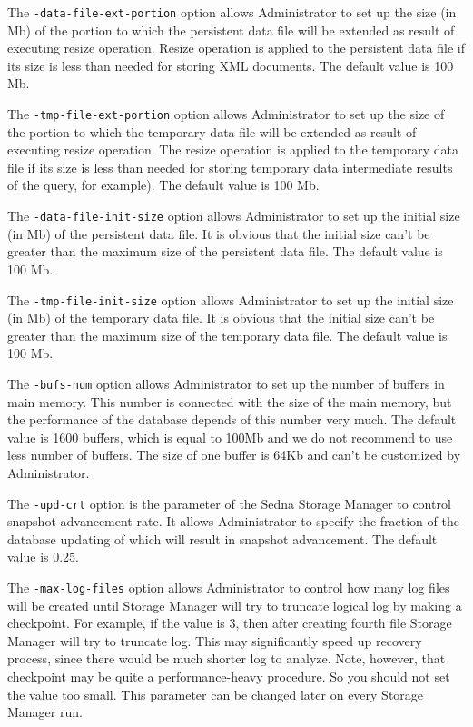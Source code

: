 \documentclass[a4paper,12pt]{article}
\begin{document}
The \verb!-data-file-ext-portion! option allows Administrator to set up the size
(in Mb) of the portion to which the persistent data file will be extended as
result of executing resize operation. Resize operation is applied to the
persistent data file if its size is less than needed for storing XML documents.
The default value is 100 Mb.

The \verb!-tmp-file-ext-portion! option allows Administrator to set up the size
of the portion to which the temporary data file will be extended as result of
executing resize operation. The resize operation is applied to the temporary
data file if its size is less than needed for storing temporary data
intermediate results of the query, for example). The default value is 100 Mb.

The \verb!-data-file-init-size! option allows Administrator to set up the
initial size (in Mb) of the persistent data file. It is obvious that the initial
size can't be greater than the maximum size of the persistent data file. The
default value is 100 Mb.

The \verb!-tmp-file-init-size! option allows Administrator to set up the initial
size (in Mb) of the temporary data file. It is obvious that the initial size
can't be greater than the maximum size of the temporary data file. The default
value is 100 Mb.

The \verb!-bufs-num! option allows Administrator to set up the number of buffers
in main memory. This number is connected with the size of the main memory, but
the performance of the database depends of this number very much. The default
value is 1600 buffers, which is equal to 100Mb and we do not recommend to use
less number of buffers. The size of one buffer is 64Kb and can't be customized
by Administrator.

The \verb!-upd-crt! option is the parameter of the Sedna Storage Manager to
control snapshot advancement rate. It allows Administrator to specify the
fraction of the database updating of which will result in snapshot advancement.
The default value is 0.25.

The \verb!-max-log-files! option allows Administrator to control how many log
files will be created until Storage Manager will try to truncate logical log by
making a checkpoint. For example, if the value is 3, then after creating
fourth file Storage Manager will try to truncate log. This may significantly
speed up recovery process, since there would be much shorter log to analyze.
Note, however, that checkpoint may be quite a performance-heavy procedure. So
you should not set the value too small. This parameter can be changed later on
every Storage Manager run.
\end{document}
